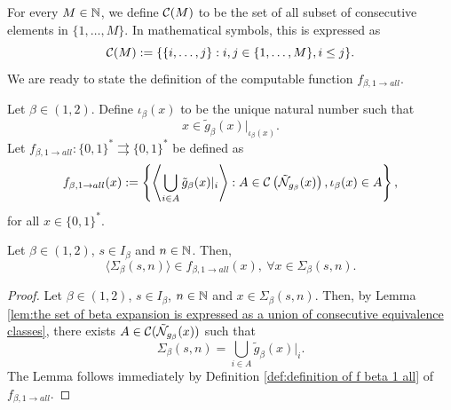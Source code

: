 \noindent For every $M \in \mathbb{N}$, we define $\mathcal{C}(M)$ to be the set of all subset of consecutive elements in $\{1,\ldots,M\}$. In mathematical symbols, this is expressed as
\begin{equation}
    \mathcal{C}(M) := \{ \{i, \ldots, j\} : i,j \in \{1,\ldots,M\}, i \leq j\}.
\end{equation}
We are ready to state the definition of the computable function $f_{\beta, 1 \to all}$. 
\begin{definition}\label{def:definition of f beta 1 all}
    Let $\beta \in (1,2)$. Define $\iota_\beta(x)$ to be the unique natural number such that 
    \begin{equation}
        x \in \tilde g_\beta(x)|_{\iota_\beta(x)}.
    \end{equation}
    Let $f_{\beta, 1 \to all} : \{0,1\}^\ast \rightrightarrows \{0,1\}^\ast$ be defined as
    \begin{equation}\label{eq:main:def:definition of f beta 1 all}
        f_{\beta, 1 \to all}(x) := \left\{ \left\langle \bigcup_{i \in A} \tilde g_{\beta}(x)|_i \right\rangle : A \in \mathcal{C}\left(\tilde {\mathcal{N}}_{g_\beta}(x)\right), \iota_\beta(x) \in A\right\},
    \end{equation}
    for all $x \in \{0,1\}^\ast$.
\end{definition}
\begin{lemma}
    Let $\beta \in (1,2)$, $s \in I_\beta$ and $n \in \mathbb{N}$. Then,
    \begin{equation}
        \langle \Sigma_\beta(s,n) \rangle \in f_{\beta, 1 \to all}(x), \ \forall x \in \Sigma_\beta(s,n).
    \end{equation}
\end{lemma}
\begin{proof}
    Let $\beta \in (1,2)$, $s \in I_\beta$, $n \in \mathbb{N}$ and $x \in \Sigma_\beta(s,n)$. Then, by Lemma \ref{lem:the set of beta expansion is expressed as a union of consecutive equivalence classes}, there exists $A \in \mathcal{C}(\tilde {\mathcal{N}}_{g_\beta}(x))$ such that 
    \begin{equation}
        \Sigma_\beta(s,n) = \bigcup_{i \in A} \tilde g_\beta(x)|_i.
    \end{equation}
    The Lemma follows immediately by Definition \ref{def:definition of f beta 1 all} of $f_{\beta, 1 \to all}$.
\end{proof}
